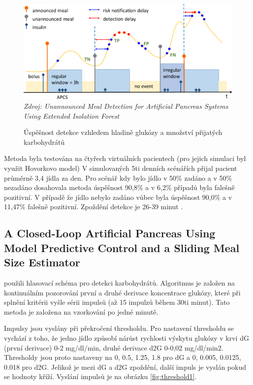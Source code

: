 \begin{figure}[H]
\caption{Úspěšnost detekce vzhledem hladině glukózy a množství přijatých karbohydrátů}
\label{fig:forest}
\includegraphics[width=1\textwidth]{img/analyza/forest.png}\\
\textit{Zdroj: Unannounced Meal Detection for Artificial Pancreas Systems Using Extended Isolation Forest \citep{Analyza.ExtendedIsolationForest}}
\end{figure}

Metoda byla testována na čtyřech virtuálních pacientech (pro jejich simulaci byl využit Hovorkovo model) V simulovaných 5ti denních scénářích přijal pacient průměrně 3,4 jídla za den. Pro scénář kdy bylo jídlo v 50\% zadáno a v 50\% nezadáno dosahovala metoda úspěšnost 90,8\% a v 6,2\% případů byla falešně pozitivní. V případě že jídlo nebylo zadáno vůbec byla úspěšnost 90,0\% a v 11,47\% falešně pozitivní. Zpoždění detekce je 26-39 minut \citep{Analyza.ExtendedIsolationForest}.


\subsection{A Closed-Loop Artificial Pancreas Using Model Predictive Control and a Sliding Meal Size Estimator}
\label{ch:thrashold}

\citet{Analyza.Thresholds} použili hlasovací schéma pro detekci karbohydrátů. Algoritmus je založen na kontinuálním  pozorování první a druhé derivace koncentrace glukózy, které při splnění kritérii vyšle sérii impulsů (až 15 impulzů během 30ti minut). Tato metoda je založena na vzorkování po jedné minutě.

 Impulsy jsou vyslány při překročení thresholdu. Pro nastavení thresholdu se vychází z toho, že jedno jídlo způsobí nárůst rychlosti výskytu glukózy v krvi dG (první derivace) 0-2 mg/dl/min, druhé derivace d2G 0-0,02 mg/dl/min2. Thresholdy jsou proto nastaveny na {0, 0.5, 1.25, 1.8} pro dG a {0, 0.005, 0.0125, 0.018} pro d2G. Jelikož je mezi dG a d2G zpoždění, další impuls je vyslán pokud se hodnoty kříží. Vyslání impulsů je na obrázku \ref{fig:threshold1}.
 
